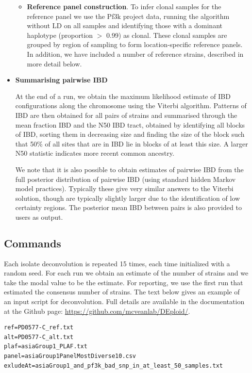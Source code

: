 \documentclass[9pt,lineno]{elife}
\begin{document}
\begin{appendixbox}
\begin{itemize}
\begin{itemize}
\item {\bf Reference panel construction}. To infer clonal samples for the reference panel we use the Pf3k project data, running the algorithm without LD on all samples and identifying those with a dominant haplotype (proportion $>$ 0.99) as clonal.  These clonal samples are grouped by region of sampling to form location-specific reference panels.  In addition, we have included a number of reference strains, described in more detail below.

\end{itemize}

\item {\bf Summarising pairwise IBD}

At the end of a run, we obtain the maximum likelihood estimate of IBD configurations along the chromosome using the Viterbi algorithm.  Patterns of IBD are then obtained for all pairs of strains and summarised through the mean fraction IBD and the N50 IBD tract, obtained by identifying all blocks of IBD, sorting them in decreasing size and finding the size of the block such that 50\% of all sites that are in IBD lie in blocks of at least this size.  A larger N50 statistic indicates more recent common ancestry.

We note that it is also possible to obtain estimates of pairwise IBD from the full posterior distribution of pairwise IBD (using standard hidden Markov model practices).  Typically these give very similar answers to the Viterbi solution, though are typically slightly larger due to the identification of low certainty regions.  The posterior mean IBD between pairs is also provided to users as output.

\end{itemize}




\subsection{Commands}
Each isolate deconvolution is repeated 15 times, each time initialized with a random seed. For each run we obtain an estimate of the number of strains and we take the modal value to be the estimate.  For reporting, we use the first run that estimated the consensus number of strains.  The text below gives an example of an input script for deconvolution.  Full details are available in the documentation at the Github page: \url{https://github.com/mcveanlab/DEploid/}.
\linespread{1}
\begin{lstlisting}
ref=PD0577-C_ref.txt
alt=PD0577-C_alt.txt
plaf=asiaGroup1_PLAF.txt
panel=asiaGroup1PanelMostDiverse10.csv
exludeAt=asiaGroup1_and_pf3k_bad_snp_in_at_least_50_samples.txt


\end{lstlisting}
\end{appendixbox}
\end{document}
